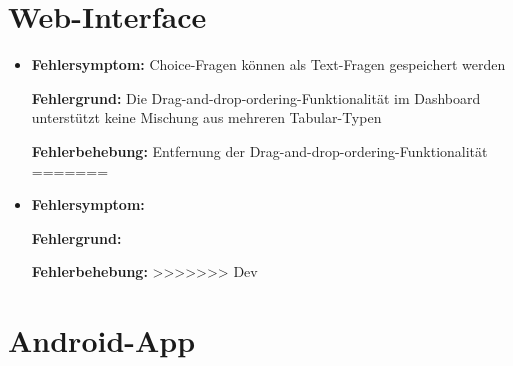 \documentclass[a4paper]{scrreprt}
\begin{document}
	      \section{Web-Interface}
		
		     \begin{itemize}
<<<<<<< HEAD
    		     \item \textbf{Fehlersymptom:} Choice-Fragen können als Text-Fragen gespeichert werden
        		     \par \textbf{Fehlergrund:} Die Drag-and-drop-ordering-Funktionalität im Dashboard unterstützt keine Mischung aus mehreren Tabular-Typen
        		     \par \textbf{Fehlerbehebung:} Entfernung der Drag-and-drop-ordering-Funktionalität
=======
		     \item \textbf{Fehlersymptom:}
		     \par \textbf{Fehlergrund:}
		     \par \textbf{Fehlerbehebung:}
>>>>>>> Dev
		     \end{itemize}
		
		  \section{Android-App}
		
\end{document}
